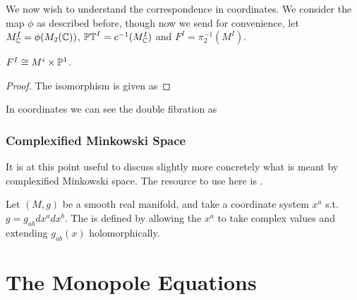 \documentclass{article}
\begin{document}
We now wish to understand the correspondence in coordinates. We consider the map $\phi$ as described before, though now we send 
for convenience, let $M^I_{\mathbb{C}}= \phi(M_2(\mathbb{C}))$, $\mathbb{PT}^I = c^{-1}(M_{\mathbb{C}}^I)$ and $F^I = \pi_2^{-1}(M^I)$.  
\begin{prop}
	$F^I \cong M^i \times \mathbb{P}^1$. 
\end{prop} 
\begin{proof}
	The isomorphism is given as 
\end{proof}
\begin{corollary}
	In coordinates we can see the double fibration as 
\end{corollary}
\subsubsection{Complexified Minkowski Space}
It is at this point useful to discuss slightly more concretely what is meant by complexified Minkowski space. The resource to use here is \cite{Adamo2018}. 
\begin{definition}
	Let $(M,g)$ be a smooth real manifold, and take a coordinate system $x^a$ s.t. $g= g_{ab} dx^a dx^b$. The  is defined by allowing the $x^a$ to take complex values and extending $g_{ab}(x)$ holomorphically.  
\end{definition}
\section{The Monopole Equations}
\end{document}
